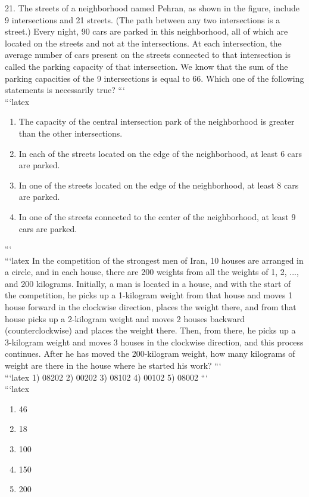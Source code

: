 21. The streets of a neighborhood named Pehran, as shown in the figure, include 9 intersections and 21 streets. (The path between any two intersections is a street.) Every night, 90 cars are parked in this neighborhood, all of which are located on the streets and not at the intersections. At each intersection, the average number of cars present on the streets connected to that intersection is called the parking capacity of that intersection. We know that the sum of the parking capacities of the 9 intersections is equal to 66. Which one of the following statements is necessarily true?
```
\\
```latex
\begin{enumerate}
    \item The capacity of the central intersection park of the neighborhood is greater than the other intersections.
    \item In each of the streets located on the edge of the neighborhood, at least 6 cars are parked.
    \item In one of the streets located on the edge of the neighborhood, at least 8 cars are parked.
    \item In one of the streets connected to the center of the neighborhood, at least 9 cars are parked.
\end{enumerate}
```
\\
```latex
In the competition of the strongest men of Iran, 10 houses are arranged in a circle, and in each house, there are 200 weights from all the weights of 1, 2, ..., and 200 kilograms. Initially, a man is located in a house, and with the start of the competition, he picks up a 1-kilogram weight from that house and moves 1 house forward in the clockwise direction, places the weight there, and from that house picks up a 2-kilogram weight and moves 2 houses backward (counterclockwise) and places the weight there. Then, from there, he picks up a 3-kilogram weight and moves 3 houses in the clockwise direction, and this process continues. After he has moved the 200-kilogram weight, how many kilograms of weight are there in the house where he started his work?
```
\\
```latex
1) 08202  2) 00202  3) 08102  4) 00102  5) 08002
```
\\
```latex
\begin{enumerate}
    \item 46
    \item 18
    \item 100
    \item 150
    \item 200
\end{enumerate}

